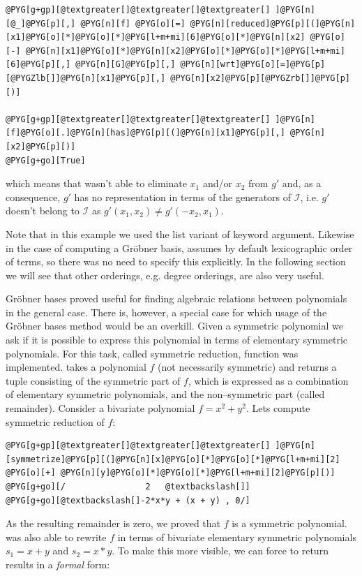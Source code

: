 \begin{Verbatim}[commandchars=@\[\]]
@PYG[g+gp][@textgreater[]@textgreater[]@textgreater[] ]@PYG[n][@_]@PYG[p][,] @PYG[n][f] @PYG[o][=] @PYG[n][reduced]@PYG[p][(]@PYG[n][x1]@PYG[o][*]@PYG[o][*]@PYG[l+m+mi][6]@PYG[o][*]@PYG[n][x2] @PYG[o][-] @PYG[n][x1]@PYG[o][*]@PYG[n][x2]@PYG[o][*]@PYG[o][*]@PYG[l+m+mi][6]@PYG[p][,] @PYG[n][G]@PYG[p][,] @PYG[n][wrt]@PYG[o][=]@PYG[p][@PYGZlb[]]@PYG[n][x1]@PYG[p][,] @PYG[n][x2]@PYG[p][@PYGZrb[]]@PYG[p][)]

@PYG[g+gp][@textgreater[]@textgreater[]@textgreater[] ]@PYG[n][f]@PYG[o][.]@PYG[n][has]@PYG[p][(]@PYG[n][x1]@PYG[p][,] @PYG[n][x2]@PYG[p][)]
@PYG[g+go][True]
\end{Verbatim}
\noindent
which means that  wasn't able to eliminate $x_1$ and/or $x_2$ from $g'$ and,
as a consequence, $g'$ has no representation in terms of the generators of $\mathcal{I}$,
i.e. $g'$ doesn't belong to $\mathcal{I}$ as $g'(x_1, x_2) \not= g'(-x_2, x_1)$.

Note that in this example we used the list variant of  keyword argument. Likewise in the
case of computing a Gröbner basis,  assumes by default lexicographic order of
terms, so there was no need to specify this explicitly. In the following section we will see that
other orderings, e.g. degree orderings, are also very useful.

Gröbner bases proved useful for finding algebraic relations between polynomials in the general
case. There is, however, a special case for which usage of the Gröbner bases method would be an
overkill. Given a symmetric polynomial we ask if it is possible to express this polynomial in terms
of elementary symmetric polynomials. For this task, called symmetric reduction, 
function was implemented.  takes a polynomial $f$ (not necessarily symmetric) and
returns a tuple consisting of the symmetric part of $f$, which is expressed as a combination of
elementary symmetric polynomials, and the non--symmetric part (called remainder). Consider a
bivariate polynomial $f = x^2 + y^2$. Lets compute symmetric reduction of $f$:

\begin{Verbatim}[commandchars=@\[\]]
@PYG[g+gp][@textgreater[]@textgreater[]@textgreater[] ]@PYG[n][symmetrize]@PYG[p][(]@PYG[n][x]@PYG[o][*]@PYG[o][*]@PYG[l+m+mi][2] @PYG[o][+] @PYG[n][y]@PYG[o][*]@PYG[o][*]@PYG[l+m+mi][2]@PYG[p][)]
@PYG[g+go][/                2   @textbackslash[]]
@PYG[g+go][@textbackslash[]-2*x*y + (x + y) , 0/]
\end{Verbatim}
\noindent
As the resulting remainder is zero, we proved that $f$ is a symmetric polynomial. 
was also able to rewrite $f$ in terms of bivariate elementary symmetric polynomials $s_1 = x + y$ and
$s_2 = x*y$. To make this more visible, we can force  to return results in a \emph{formal}
form:

